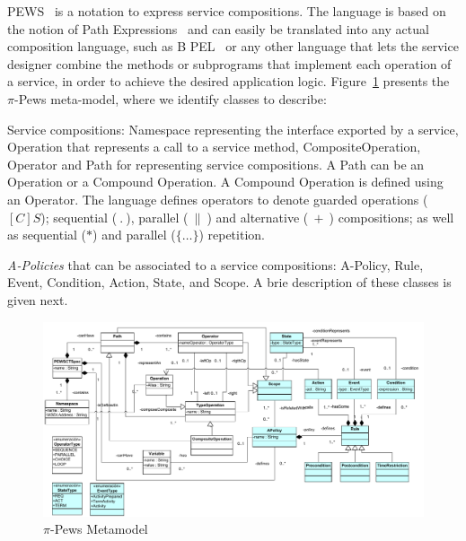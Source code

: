 PEWS~\cite{BHM06,Placido2010LTPD} is a notation to express service compositions.
The language is based on the notion of Path Expressions~\cite{And79} and can easily be translated into any actual composition language, such as B	PEL~\cite{bpel03} or any other language that lets the service designer combine the methods or subprograms that implement each operation of a service, in order to achieve the desired application logic. 
Figure~\ref{fig:metamodel} presents the $\pi$-{\sc Pews} meta-model, where we identify classes to describe:
\begin{itemizedTrivlist}
\item Service compositions: {\sc Namespace} representing the interface exported by a service, {\sc Operation} that represents a call to a service method, {\sc CompositeOperation}, {\sc Operator} and {\sc Path} for representing service compositions.
A {\sc Path} can be an {\sc Operation} or a {\sc Compound Operation}. 
A {\sc Compound Operation} is defined using an {\sc Operator}.
The language defines operators to denote guarded operations ($[C]S$); sequential ($\ . \ $), parallel ($\ \| \ $) and alternative ($\ + \ $) compositions; as well as sequential ($*$) and parallel ($\{\dots\}$) repetition.

\item {\em A-Policies} that can be associated to a service compositions:  {\sc A-Policy}, {\sc Rule}, {\sc Event}, {\sc Condition}, {\sc Action}, {\sc State}, and {\sc Scope}.
A brie description of these classes is given next.
\end{itemizedTrivlist}
%
\begin{figure}[t]
\centering
\includegraphics[width=1.0\textwidth]{figs/PEWSMetamodel}
\caption{$\pi$-{\sc Pews} Metamodel}
\label{fig:metamodel}
\end{figure}

